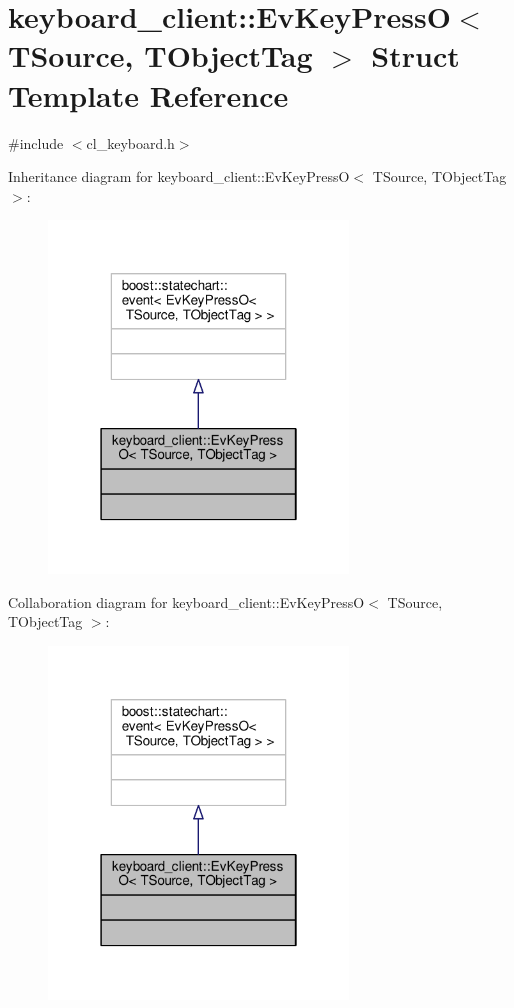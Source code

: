 \hypertarget{structkeyboard__client_1_1EvKeyPressO}{}\section{keyboard\+\_\+client\+:\+:Ev\+Key\+PressO$<$ T\+Source, T\+Object\+Tag $>$ Struct Template Reference}
\label{structkeyboard__client_1_1EvKeyPressO}


{\ttfamily \#include $<$cl\+\_\+keyboard.\+h$>$}



Inheritance diagram for keyboard\+\_\+client\+:\+:Ev\+Key\+PressO$<$ T\+Source, T\+Object\+Tag $>$\+:\nopagebreak
\begin{figure}[H]
\begin{center}
\leavevmode
\includegraphics[width=226pt]{structkeyboard__client_1_1EvKeyPressO__inherit__graph}
\end{center}
\end{figure}


Collaboration diagram for keyboard\+\_\+client\+:\+:Ev\+Key\+PressO$<$ T\+Source, T\+Object\+Tag $>$\+:\nopagebreak
\begin{figure}[H]
\begin{center}
\leavevmode
\includegraphics[width=226pt]{structkeyboard__client_1_1EvKeyPressO__coll__graph}
\end{center}
\end{figure}


